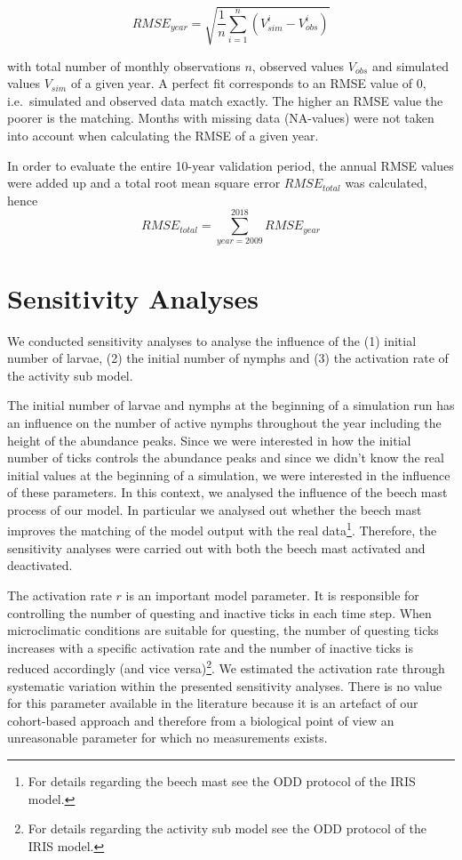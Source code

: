 \documentclass[a4paper, 11pt]{scrartcl}
\begin{document}
\begin{equation}\label{eq:rmse}
RMSE_{year} = \sqrt{ \frac{1}{n} \sum_{i=1}^n (V_{sim}^i - V_{obs}^i)}
\end{equation}

with total number of monthly observations $n$, observed values $V_{obs}$ and simulated values $V_{sim}$ of a given year. A perfect fit corresponds to an RMSE value of 0, i.e.\
simulated and observed data match exactly. The higher an RMSE value the poorer is the matching. Months with missing data (NA-values) were not taken into account when
calculating the RMSE of a given year.

In order to evaluate the entire 10-year validation period, the annual RMSE values were added up and a total root mean square error $RMSE_{total}$ was calculated, hence
\begin{equation}\label{eq:total_rmse}
RMSE_{total} = \sum_{year=2009}^{2018} RMSE_{year}
\end{equation}


\section{Sensitivity Analyses}
We conducted sensitivity analyses to analyse the influence of the (1) initial number of larvae, (2) the initial number of nymphs and (3) the activation rate of the activity sub
model.

The initial number of larvae and nymphs at the beginning of a simulation run has an influence on the number of active nymphs throughout the year including the height of the
abundance peaks. Since we were interested in how the initial number of ticks controls the abundance peaks and since we didn't know the real initial values at the beginning of a
simulation, we were interested in the influence of these parameters. In this context, we analysed the influence of the beech mast process of our model. In
particular we analysed out whether the beech mast improves the matching of the model output with the real data\footnote{For details regarding the beech mast
see the ODD protocol of the IRIS model.}. Therefore, the sensitivity analyses were carried out with both the beech mast activated and deactivated.

The activation rate $r$ is an important model parameter. It is responsible for controlling the number of questing and inactive ticks in each time step. When microclimatic
conditions are suitable for questing, the number of questing ticks increases with a specific activation rate and the number of inactive ticks is reduced accordingly (and vice
versa)\footnote{For details regarding the activity sub model see the ODD protocol of the IRIS model.}. We estimated the activation rate through systematic variation within the
presented sensitivity analyses. There is no value for this parameter available in the literature because it is an artefact of our cohort-based approach and
therefore from a biological point of view an unreasonable parameter for which no measurements exists.
\end{document}
